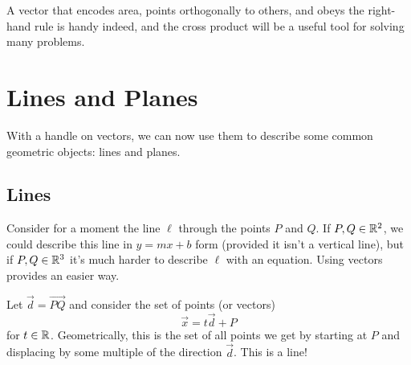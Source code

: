 A vector that encodes area, points orthogonally to others, and obeys the right-hand
rule is handy indeed, and the cross product will be a useful tool for solving
many problems.


\begin{exercises}
\end{exercises}


\section{Lines and Planes}

With a handle on vectors, we can now use them to describe some common geometric
objects: lines and planes.

\subsection{Lines}
Consider for a moment the line $\ell$ through the points $P$ and $Q$.  If $P,Q\in\mathbb{R}^2$, we
could describe this line in $y=mx+b$ form (provided it isn't a vertical line), but if
$P,Q\in\mathbb{R}^3$ it's much harder to describe $\ell$ with an equation.  Using vectors
provides an easier way.

Let $\vec d=\overrightarrow{PQ}$ and consider the set of points (or vectors)
\[
	\vec x=t\vec d+P
\]
for $t\in \mathbb{R}$.  Geometrically, this is the set of all points we get by starting at $P$ and
displacing by some multiple of the direction $\vec d$.  This is a line!


